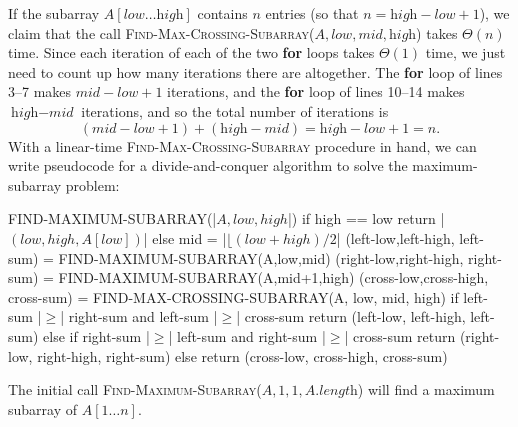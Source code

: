 \documentclass{report}
\begin{document}
        \bigbreak \noindent 
        If the subarray \( A[\textit{low} \ldots \textit{high}] \) contains \( n \) entries (so that \( n = \textit{high} - \textit{low} + 1 \)), we claim that the call \textsc{Find-Max-Crossing-Subarray}(\( A, \textit{low}, \textit{mid}, \textit{high} \)) takes \( \Theta(n) \) time. Since each iteration of each of the two \textbf{for} loops takes \( \Theta(1) \) time, we just need to count up how many iterations there are altogether. The \textbf{for} loop of lines 3–7 makes \( \textit{mid} - \textit{low} + 1 \) iterations, and the \textbf{for} loop of lines 10–14 makes \( \textit{high} - \textit{mid} \) iterations, and so the total number of iterations is
        \[
            (\textit{mid} - \textit{low} + 1) + (\textit{high} - \textit{mid}) = \textit{high} - \textit{low} + 1 = n .
        \]
        With a linear-time \textsc{Find-Max-Crossing-Subarray} procedure in hand, we can write pseudocode for a divide-and-conquer algorithm to solve the maximum-subarray problem:
        \pagebreak 
        \bigbreak \noindent 
        \begin{cppcode}
        FIND-MAXIMUM-SUBARRAY(|$A, low, high$|)
            if high == low 
                return |$(low, high, A[low])$|
            else mid = |$\lfloor (low + high)/2$\rfloor|
                (left-low,left-high, left-sum) = 
                    FIND-MAXIMUM-SUBARRAY(A,low,mid)
                (right-low,right-high, right-sum) = 
                    FIND-MAXIMUM-SUBARRAY(A,mid+1,high)
                (cross-low,cross-high, cross-sum) = 
                    FIND-MAX-CROSSING-SUBARRAY(A, low, mid, high)
                if left-sum |$ \geq $| right-sum and left-sum |$ \geq $| cross-sum
                    return (left-low, left-high, left-sum)
                else if right-sum |$ \geq$| left-sum and right-sum |$ \geq$| cross-sum
                    return (right-low, right-high, right-sum)
                else return (cross-low, cross-high, cross-sum)
        \end{cppcode}
        \bigbreak \noindent 
        The initial call \textsc{Find-Maximum-Subarray}(\( A, 1, 1, A.\textit{length} \)) will find a maximum subarray of \( A[1 \ldots n] \).
        \bigbreak \noindent 
\end{document}
